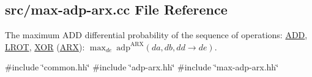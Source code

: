 \hypertarget{max-adp-arx_8cc}{\subsection{src/max-\/adp-\/arx.cc \-File \-Reference}
\label{max-adp-arx_8cc}
}


\-The maximum \-A\-D\-D differential probability of the sequence of operations\-: \hyperlink{common_8hh_af3b709fb668cf93ca09e2a46a2a031a8}{\-A\-D\-D}, \hyperlink{common_8hh_abe2030c44a97657e1b1dbe9b0e093a7b}{\-L\-R\-O\-T}, \hyperlink{common_8hh_a6de9ec3b3b57377b69a82239ea52ec6e}{\-X\-O\-R} (\hyperlink{common_8hh_a7d3da57c58af293c7c57e4f1b551849d}{\-A\-R\-X})\-: $\max_{de}~\mathrm{adp}^{\mathrm{ARX}}(da,db,dd \rightarrow de)$.  


{\ttfamily \#include \char`\"{}common.\-hh\char`\"{}}\*
{\ttfamily \#include \char`\"{}adp-\/arx.\-hh\char`\"{}}\*
{\ttfamily \#include \char`\"{}max-\/adp-\/arx.\-hh\char`\"{}}\*
